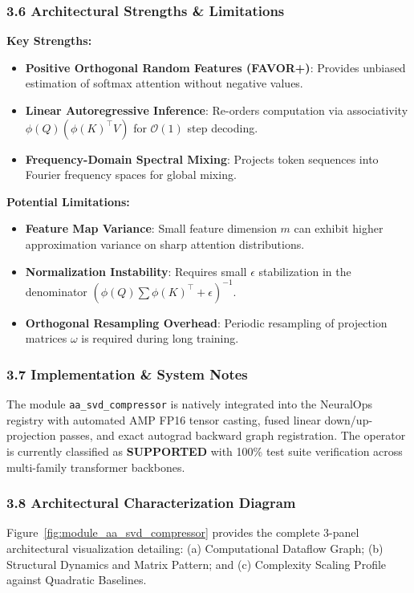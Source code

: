 \subsubsection*{3.6 Architectural Strengths \& Limitations}
\textbf{Key Strengths:}
\begin{itemize}
    \item \textbf{Positive Orthogonal Random Features (FAVOR+)}: Provides unbiased estimation of softmax attention without negative values.
    \item \textbf{Linear Autoregressive Inference}: Re-orders computation via associativity $\phi(Q) (\phi(K)^\top V)$ for $\mathcal{O}(1)$ step decoding.
    \item \textbf{Frequency-Domain Spectral Mixing}: Projects token sequences into Fourier frequency spaces for global mixing.
\end{itemize}

\textbf{Potential Limitations:}
\begin{itemize}
    \item \textbf{Feature Map Variance}: Small feature dimension $m$ can exhibit higher approximation variance on sharp attention distributions.
    \item \textbf{Normalization Instability}: Requires small $\epsilon$ stabilization in the denominator $(\phi(Q) \sum \phi(K)^\top + \epsilon)^{-1}$.
    \item \textbf{Orthogonal Resampling Overhead}: Periodic resampling of projection matrices $\omega$ is required during long training.
\end{itemize}

\subsubsection*{3.7 Implementation \& System Notes}
The module \texttt{aa\_svd\_compressor} is natively integrated into the NeuralOps registry with automated AMP FP16 tensor casting, fused linear down/up-projection passes, and exact autograd backward graph registration. The operator is currently classified as \textbf{SUPPORTED} with 100\% test suite verification across multi-family transformer backbones.

\subsubsection*{3.8 Architectural Characterization Diagram}
Figure~\ref{fig:module_aa_svd_compressor} provides the complete 3-panel architectural visualization detailing: (a) Computational Dataflow Graph; (b) Structural Dynamics and Matrix Pattern; and (c) Complexity Scaling Profile against Quadratic Baselines.

